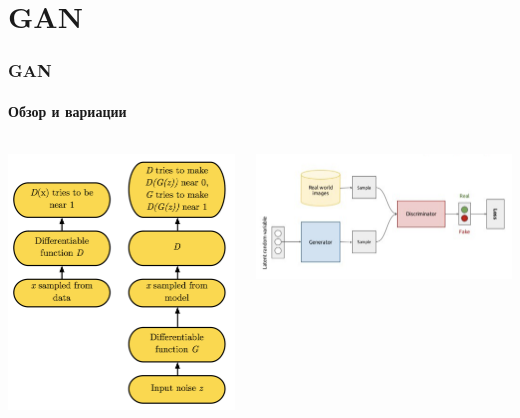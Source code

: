 \documentclass[10pt]{beamer}
\begin{document}
\section{GAN}
\begin{frame}
\frametitle{GAN}
\framesubtitle{Обзор и вариации}

\begin{columns}
    \begin{column}{0.35\textwidth}
        \begin{center}
            \includegraphics[width=\textwidth]{images/gan_fw.png}
        \end{center}
    \end{column}
    \begin{column}{0.65\textwidth}
        \begin{center}
            \vskip-8mm
            \includegraphics[width=\textwidth]{images/fan_ov.png}\\

\end{center}
\end{column}
\end{columns}
\end{frame}
\end{document}
